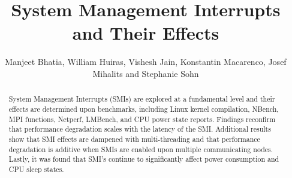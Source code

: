 \documentclass{IEEEtran}
\title{System Management Interrupts and Their Effects}
\author{
    Manjeet Bhatia, William Huiras, Vishesh Jain, Konstantin Macarenco, Josef Mihalits and Stephanie Sohn\\
}
\begin{document}
\maketitle
\thispagestyle{plain}
\pagestyle{plain}
\begin{abstract}
System Management Interrupts (SMIs) are explored at a fundamental level and their effects are determined upon benchmarks, including Linux kernel compilation, NBench, MPI functions, Netperf, LMBench, and CPU power state reports. Findings reconfirm that performance degradation scales with the latency of the SMI. Additional results show that SMI effects are dampened with multi-threading and that performance degradation is additive when SMIs are enabled upon multiple communicating nodes. Lastly, it was found that SMI’s continue to significantly affect power consumption and CPU sleep states.
\end{abstract}

\tableofcontents
\end{document}
